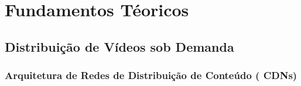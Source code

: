 \documentclass[
	12pt,				%
	oneside,			%
	a4paper,			%
	english,			%
	brazil				%
	]{abntex2ppgsi}
\begin{document}
\chapter{Fundamentos Téoricos}



\section{Distribuição de Vídeos sob Demanda}



\subsection{Arquitetura de Redes de Distribuição de Conteúdo ( CDNs)}

\end{document}
